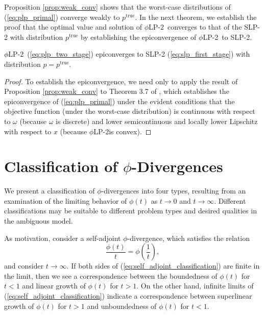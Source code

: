 \documentclass[ijoc,nonblindrev]{informs3} %
\newcommand{\ptrue}{p^{\text{true}}}
\newcommand{\plp}{$\phi$LP-2}
\begin{document}
Proposition \ref{prop:weak_conv} shows that the worst-case distributions of (\ref{eq:plp_primal}) converge weakly to $\ptrue$.
In the next theorem, we establish the proof that the optimal value and solution of \plp\ converges to that of the SLP-2 with distribution $\ptrue$ by establishing the epiconvergence of \plp\ to SLP-2.
\begin{theorem}
	\plp\ (\ref{eq:plp_two_stage}) epiconverges to SLP-2 (\ref{eq:slp_first_stage}) with distribution $p = \ptrue$.
\end{theorem}

\begin{proof}
	To establish the epiconvergence, we need only to apply the result of Proposition \ref{prop:weak_conv} to Theorem 3.7 of \cite{dupacova1988asymptotic}, which establishes the epiconvergence of (\ref{eq:plp_primal}) under the evident conditions that the objective function (under the worst-case distribution) is continuous with respect to $\omega$ (because $\omega$ is discrete) and lower semicontinuous and locally lower Lipschitz with respect to $x$ (because \plp is convex).
\end{proof}

\section{Classification of $\phi$-Divergences}
\label{sec:classification}

We present a classification of $\phi$-divergences into four types, resulting from an examination of the limiting behavior of $\phi(t)$ as $t \rightarrow 0$ and $t \rightarrow \infty$.
Different classifications may be suitable to different problem types and desired qualities in the ambiguous model.

As motivation, consider a self-adjoint $\phi$-divergence, which satisfies the relation
\begin{equation} \label{eq:self_adjoint_classification}
	\frac{\phi(t)}{t} = \phi\left(\frac{1}{t}\right),
\end{equation}
and consider $t \rightarrow \infty$.
If both sides of (\ref{eq:self_adjoint_classification}) are finite in the limit, then we see a correspondence between the boundedness of $\phi(t)$ for $t < 1$ and linear growth of $\phi(t)$ for $t > 1$.
On the other hand, infinite limits of (\ref{eq:self_adjoint_classification}) indicate a correspondence between superlinear growth of $\phi(t)$ for $t > 1$ and unboundedness of $\phi(t)$ for $t < 1$.
\end{document}
